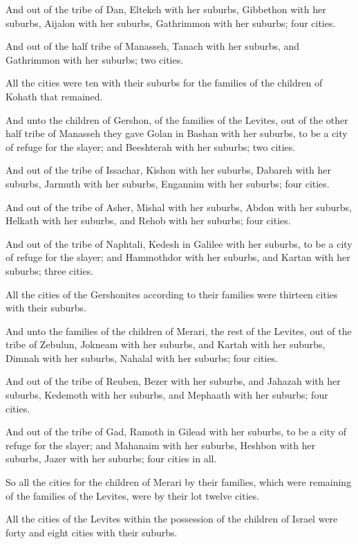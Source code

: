 \verse And out of the tribe of Dan, Eltekeh with her suburbs, Gibbethon with her suburbs, \verse Aijalon with her suburbs, Gathrimmon with her suburbs; four cities.

\verse And out of the half tribe of Manasseh, Tanach with her suburbs, and Gathrimmon with her suburbs; two cities.

\verse All the cities were ten with their suburbs for the families of the children of Kohath that remained.

\verse And unto the children of Gershon, of the families of the Levites, out of the other half tribe of Manasseh they gave Golan in Bashan with her suburbs, to be a city of refuge for the slayer; and Beeshterah with her suburbs; two cities.

\verse And out of the tribe of Issachar, Kishon with her suburbs, Dabareh with her suburbs, \verse Jarmuth with her suburbs, Engannim with her suburbs; four cities.

\verse And out of the tribe of Asher, Mishal with her suburbs, Abdon with her suburbs, \verse Helkath with her suburbs, and Rehob with her suburbs; four cities.

\verse And out of the tribe of Naphtali, Kedesh in Galilee with her suburbs, to be a city of refuge for the slayer; and Hammothdor with her suburbs, and Kartan with her suburbs; three cities.

\verse All the cities of the Gershonites according to their families were thirteen cities with their suburbs.

\verse And unto the families of the children of Merari, the rest of the Levites, out of the tribe of Zebulun, Jokneam with her suburbs, and Kartah with her suburbs, \verse Dimnah with her suburbs, Nahalal with her suburbs; four cities.

\verse And out of the tribe of Reuben, Bezer with her suburbs, and Jahazah with her suburbs, \verse Kedemoth with her suburbs, and Mephaath with her suburbs; four cities.

\verse And out of the tribe of Gad, Ramoth in Gilead with her suburbs, to be a city of refuge for the slayer; and Mahanaim with her suburbs, \verse Heshbon with her suburbs, Jazer with her suburbs; four cities in all.

\verse So all the cities for the children of Merari by their families, which were remaining of the families of the Levites, were by their lot twelve cities.

\verse All the cities of the Levites within the possession of the children of Israel were forty and eight cities with their suburbs.

